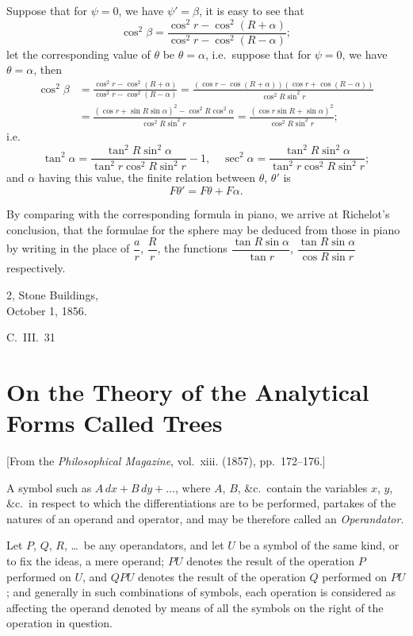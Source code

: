 \documentclass[11pt,a4paper]{book}
\begin{document}
{{Suppose that for $\psi = 0$, we have $\psi' = \beta$, it is easy to see that
\[
\cos^2\beta = \frac{\cos^2 r - \cos^2(R+\alpha)}{\cos^2 r - \cos^2(R-\alpha)};
\]
let the corresponding value of $\theta$ be $\theta = \alpha$, i.e.\ suppose that for $\psi = 0$, we have $\theta = \alpha$, then
\begin{align*}
\cos^2\beta &= \frac{\cos^2 r - \cos^2(R+\alpha)}{\cos^2 r - \cos^2(R-\alpha)} = \frac{(\cos r - \cos(R+\alpha))(\cos r + \cos(R-\alpha))}{\cos^2 R \sin^2 r} \\
&= \frac{(\cos r + \sin R \sin\alpha)^2 - \cos^2 R \cos^2\alpha}{\cos^2 R \sin^2 r} = \frac{(\cos r \sin R + \sin\alpha)^2}{\cos^2 R \sin^2 r};
\end{align*}
i.e.
\[
\tan^2\alpha = \frac{\tan^2 R \sin^2\alpha}{\tan^2 r \cos^2 R \sin^2 r} - 1, \quad \sec^2\alpha = \frac{\tan^2 R \sin^2\alpha}{\tan^2 r \cos^2 R \sin^2 r};
\]
and $\alpha$ having this value, the finite relation between $\theta$, $\theta'$ is
\[
F\theta' = F\theta + F\alpha.
\]

By comparing with the corresponding formula in piano, we arrive at Richelot's conclusion, that the formulae for the sphere may be deduced from those in piano by writing in the place of $\dfrac{a}{r}$, $\dfrac{R}{r}$, the functions $\dfrac{\tan R \sin\alpha}{\tan r}$, $\dfrac{\tan R \sin\alpha}{\cos R \sin r}$ respectively.

\begin{flushright}
2, Stone Buildings,\\
October 1, 1856.
\end{flushright}
\hfill C.~III.~31
\newpage


\section{On the Theory of the Analytical Forms Called Trees}
\label{sec:203}

[From the \textit{Philosophical Magazine}, vol.~xiii. (1857), pp.~172--176.]
\vspace{1em}

A symbol such as $A\,dx + B\,dy + \ldots$, where $A$, $B$, \&c.\ contain the variables $x$, $y$, \&c.\ in respect to which the differentiations are to be performed, partakes of the natures of an operand and operator, and may be therefore called an \textit{Operandator}.

Let $P$, $Q$, $R$, \ldots\ be any operandators, and let $U$ be a symbol of the same kind, or to fix the ideas, a mere operand; $PU$ denotes the result of the operation $P$ performed on $U$, and $QPU$ denotes the result of the operation $Q$ performed on $PU$; and generally in such combinations of symbols, each operation is considered as affecting the operand denoted by means of all the symbols on the right of the operation in question.

}}
\end{document}
